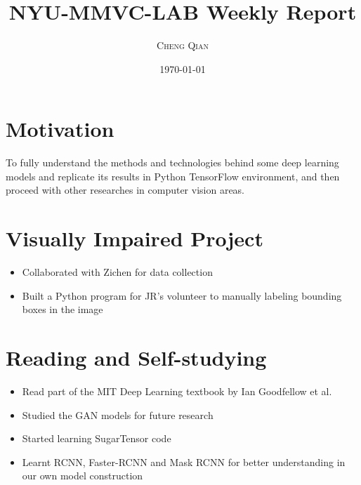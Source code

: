 \documentclass{article}
\title{NYU-MMVC-LAB Weekly Report} %
\author{\textsc{Cheng Qian}} %
\date{\today} %
\begin{document}
\maketitle %




\section{Motivation}

To fully understand the methods and technologies behind some deep learning models and replicate its results in Python TensorFlow environment, and then proceed with other researches in computer vision areas.


\section{Visually Impaired Project}

\begin{itemize}
	\item Collaborated with Zichen for data collection
	\item Built a Python program for JR's volunteer to manually labeling bounding boxes in the image
\end{itemize}



\section{Reading and Self-studying}

\begin{itemize}
	\item Read part of the MIT Deep Learning textbook by Ian Goodfellow et al.
	\item Studied the GAN models for future research
	\item Started learning SugarTensor code
	\item Learnt RCNN, Faster-RCNN and Mask RCNN for better understanding in our own model construction
\end{itemize}


\end{document}
